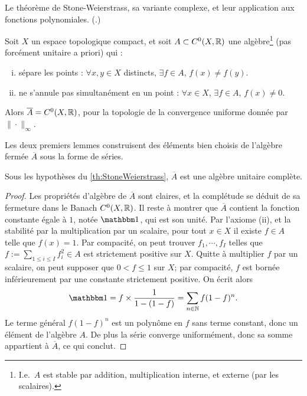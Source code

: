 \begin{retenir}
Le théorème de Stone-Weierstrass, sa variante complexe, et leur application aux fonctions polynomiales.
(.)
\end{retenir}


\begin{theorem}
\label{th:StoneWeierstrass}
%
	Soit $X$ un espace topologique compact, et soit $A \subset C^0(X,\mathbb{R})$ une algèbre\footnote{I.e.\ $A$ est stable par addition, multiplication interne, et externe (par les scalaires).} (pas forcément unitaire a priori) qui : 
	\begin{enumerate}[(i)]
		\item sépare les points : $\forall x, y \in X$ distincts, $\exists f \in A$, $f(x) \neq f(y)$.
		\item ne s'annule pas simultanément en un point : $\forall x \in X$, $\exists f \in A$, $f(x)\neq 0$. 
	\end{enumerate} 
	Alors $\overline A = C^0(X,\mathbb{R})$, pour la topologie de la convergence uniforme donnée par $\|\cdot\|_\infty$. 
\end{theorem}

Les deux premiers lemmes construisent des éléments bien choisis de l'algèbre fermée $\overline A$ sous la forme de séries.

\begin{lemma} 
\label{lem:StoneUnite}
%
Sous les hypothèses du \cref{th:StoneWeierstrass}, $\overline A$ est une algèbre unitaire complète. 
\end{lemma}

\begin{proof}
	Les propriétés d'algèbre de $\overline A$ sont claires, et la complétude se déduit de sa fermeture dans le Banach $C^0(X,\mathbb{R})$. Il reste à montrer que $\overline A$ contient la fonction constante égale à $1$, notée $\bbone$, qui est son unité. Par l'axiome (ii), et la stabilité par la multiplication par un scalaire, pour tout $x \in X$ il existe $f \in A$ telle que $f(x)=1$. 
	Par compacité, on peut trouver $f_1,\cdots,f_I$ telles que $f := \sum_{1 \leq i \leq I} f_i^2 \in A$ est strictement positive sur $X$. Quitte à multiplier $f$ par un scalaire, on peut supposer que $0< f\leq 1$ sur $X$; par compacité, $f$ est bornée inférieurement par une constante strictement positive.
	On écrit alors 
	\begin{equation}
		\bbone = f \times \frac 1 {1-(1-f)} = \sum_{n \in \bN} f (1-f)^n.
	\end{equation}
	Le terme général $f (1-f)^n$ est un polynôme en $f$ sans terme constant, donc un élément de l'algèbre $A$. De plus la série converge uniformément, donc sa somme appartient à $\overline A$, ce qui conclut.
\end{proof}

